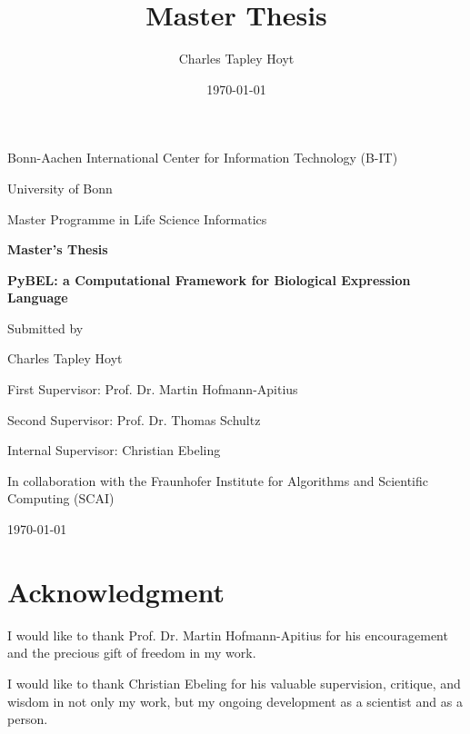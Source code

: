 \documentclass[twoside, 12pt,  footinclude=true,  headinclude=true,  cleardoublepage=empty]{scrbook}
\title{Master Thesis}
\author{Charles Tapley Hoyt}
\date{\today}
\begin{document}
	\begin{titlepage}
		\centering
		Bonn-Aachen International Center for Information Technology (B-IT)
		
		University of Bonn
		
		 Master Programme in Life Science Informatics
		
		\vspace{1in}
		 {\Large \bfseries Master's Thesis}
		\vspace{1in}
		
		{\LARGE \bfseries PyBEL: a Computational Framework for Biological Expression Language}
		\vspace{1in}
		
		{\large Submitted by}
		
		{\LARGE Charles Tapley Hoyt\par}
		
		\vspace{1in}
		
			First Supervisor: Prof. Dr. Martin Hofmann-Apitius
			\par
			Second Supervisor: Prof. Dr. Thomas Schultz
			\par
			Internal Supervisor: Christian Ebeling
			
		\vfill
		In collaboration with the Fraunhofer Institute for Algorithms and Scientific Computing (SCAI)
		\begin{flushleft}
			\today
		\end{flushleft}
		
	\end{titlepage}
	
	
	
	\frontmatter

\chapter*{Acknowledgment}

\begingroup
\setlength{\parskip}{1em}
		
I would like to thank Prof. Dr. Martin Hofmann-Apitius for his encouragement and the precious gift of freedom in my work.
        
I would like to thank Christian Ebeling for his valuable supervision, critique, and wisdom in not only my work, but my ongoing development as a scientist and as a person.
\end{document}
